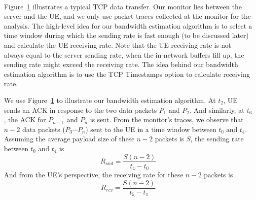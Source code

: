 \label{sec:tcp.estimation}

\begin{figure}[t]
\centering
{}\\
\label{fig:algo}
\end{figure}

Figure~\ref{fig:algo} illustrates a typical TCP data transfer. Our monitor lies between the server and the UE, and we only use packet traces collected at the monitor for the analysis. The high-level idea for our bandwidth estimation algorithm is to select a time window during which the sending rate is fast enough (to be discussed later) and calculate the UE receiving rate. Note that the UE receiving rate is not always equal to the server sending rate, \eg when the in-network buffers fill up, the sending rate might exceed the receiving rate. The idea behind our bandwidth estimation algorithm is to use the TCP Timestamps option to calculate receiving rate.

We use Figure~\ref{fig:algo} to illustrate our bandwidth estimation algorithm. At $t_{2}$, UE sends an ACK in response to the two data packets $P_{1}$ and $P_{2}$. And similarly, at $t_{6}$, the ACK for $P_{n-1}$ and $P_{n}$ is sent. From the monitor's traces, we observe that $n-2$ data packets ($P_{3} \cdots P_{n}$) sent to the UE in a time window between $t_{0}$ and $t_{4}$. Assuming the average payload size of these $n-2$ packets is $S$, the sending rate between $t_{0}$ and $t_{4}$ is
\begin{equation}
\label{eq:snd}
R_{snd} = \frac{S (n - 2)}{t_{4} - t_{0}}
\end{equation}
And from the UE's perspective, the receiving rate for these $n-2$ packets is
\begin{displaymath}
R_{rcv} = \frac{S (n - 2)}{t_{5} - t_{1}}
\end{displaymath}

